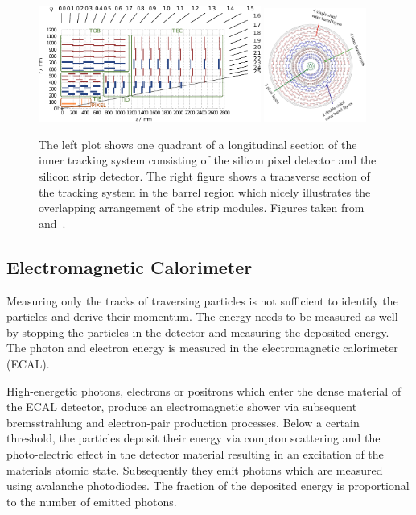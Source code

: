 \begin{figure}[htp]
    \centering
    \includegraphics[width=0.65\textwidth]{figures/cms_detector/tracker.pdf}\hfill
    \includegraphics[width=0.3\textwidth]{figures/cms_detector/tracking_sytem_barrel_slice.png}
    \caption[Inner Tracking System]{The left plot shows one quadrant of a
        longitudinal section of the inner tracking system consisting of the
        silicon pixel detector and the silicon strip detector. The right figure shows a
        transverse section of the tracking system in the barrel region which
        nicely illustrates the overlapping arrangement of the strip modules. Figures taken
        from~\cite{Berger:2014aca} and~\cite{cmsweb:innertracker}.}
    \label{fig:cms:inner_tracking}
\end{figure}

\subsection{Electromagnetic Calorimeter}

Measuring only the tracks of traversing particles is not sufficient to identify
the particles and derive their momentum. The energy needs to be measured as well
by stopping the particles in the detector and measuring the
deposited energy. The photon and electron energy is measured in the
electromagnetic calorimeter (ECAL). 

High-energetic photons, electrons or positrons which enter the dense material of
the ECAL detector, produce an electromagnetic shower via subsequent
bremsstrahlung and electron-pair production processes. Below a certain
threshold, the particles deposit their energy via compton scattering and the
photo-electric effect in the detector material resulting in an excitation of the
materials atomic state. Subsequently they emit photons which are measured using
avalanche photodiodes. The fraction of the deposited energy is proportional to
the number of emitted photons.

